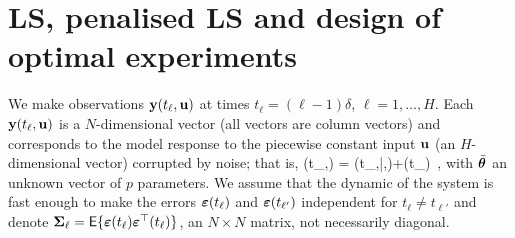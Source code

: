 \documentclass{article}
\newcommand{\BL}[1]{{\textcolor{blue}{[\textcolor{red}{Question => Luc}: \textit{#1})}}}
\newcommand{\Luccomment}[1]{\todo[color=yellow]{#1}}
\newcommand{\Lucinline}[1]{\todo[inline,color=yellow]{#1}}
\DeclareMathOperator*{\argmax}{\arg\!\max}
\begin{document}










\section{LS, penalised LS and design of optimal experiments}


We make observations $\mathbf{y}(t_\ell,\mathbf{u})$ at times $t_\ell=(\ell-1)\delta$, $\ell=1,\ldots,H$. Each $\mathbf{y}(t_\ell,\mathbf{u})$ is a $N$-dimensional vector (all vectors are column vectors) and corresponds to the model response to the piecewise constant input $\mathbf{u}$ (an $H$-dimensional vector) corrupted by noise; that is,
\beq\label{model1}
\yb(t_\ell,\ub) = \etab(t_\ell,\bar\mtb,\ub)+\mveb(t_\ell) \,,
\eeq
with $\bar{\boldsymbol{\theta}}$ an unknown vector of $p$ parameters. We assume that the dynamic of the system is fast enough to make the errors $\boldsymbol{\varepsilon}(t_\ell)$ and $\boldsymbol{\varepsilon}(t_{\ell'})$ independent for $t_\ell\neq t_{\ell'}$ and denote $\boldsymbol{\Sigma}_\ell=\mathsf{E}\{\boldsymbol{\varepsilon}(t_\ell)\boldsymbol{\varepsilon}^\top(t_\ell)\}$, an $N \times N$ matrix, not necessarily diagonal.
\end{document}
